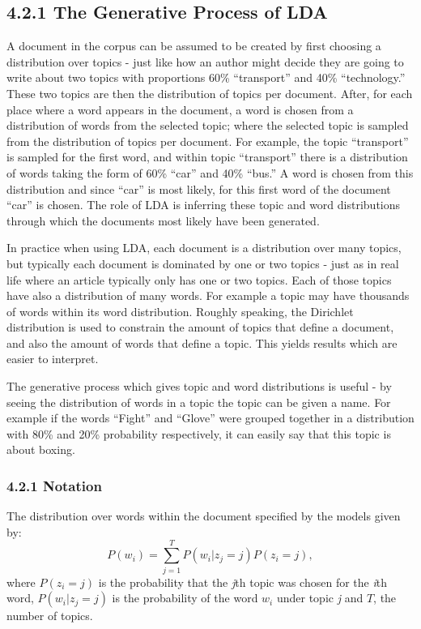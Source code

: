 \documentclass[
]{article}
\begin{document}
\hypertarget{the-generative-process-of-lda}{%
\subsection{4.2.1 The Generative Process of
LDA}\label{the-generative-process-of-lda}}

A document in the corpus can be assumed to be created by first choosing
a distribution over topics - just like how an author might decide they
are going to write about two topics with proportions 60\% ``transport''
and 40\% ``technology.'' These two topics are then the distribution of
topics per document. After, for each place where a word appears in the
document, a word is chosen from a distribution of words from the
selected topic; where the selected topic is sampled from the
distribution of topics per document. For example, the topic
``transport'' is sampled for the first word, and within topic
``transport'' there is a distribution of words taking the form of 60\%
``car'' and 40\% ``bus.'' A word is chosen from this distribution and
since ``car'' is most likely, for this first word of the document
``car'' is chosen. The role of LDA is inferring these topic and word
distributions through which the documents most likely have been
generated.

In practice when using LDA, each document is a distribution over many
topics, but typically each document is dominated by one or two topics -
just as in real life where an article typically only has one or two
topics. Each of those topics have also a distribution of many words. For
example a topic may have thousands of words within its word
distribution. Roughly speaking, the Dirichlet distribution is used to
constrain the amount of topics that define a document, and also the
amount of words that define a topic. This yields results which are
easier to interpret.

The generative process which gives topic and word distributions is
useful - by seeing the distribution of words in a topic the topic can be
given a name. For example if the words ``Fight'' and ``Glove'' were
grouped together in a distribution with 80\% and 20\% probability
respectively, it can easily say that this topic is about boxing.

\hypertarget{notation}{%
\subsubsection{4.2.1 Notation}\label{notation}}

The distribution over words within the document specified by the models
given by: \begin{equation}
P(w_i) = \sum_{j=1}^{T}P(w_i|z_j =j)P(z_i=j),
\end{equation} where \(P(z_i=j)\) is the probability that the \emph{j}th
topic was chosen for the \emph{i}th word, \(P(w_i|z_j =j)\) is the
probability of the word \(w_i\) under topic \emph{j} and \(T\), the
number of topics.
\end{document}
